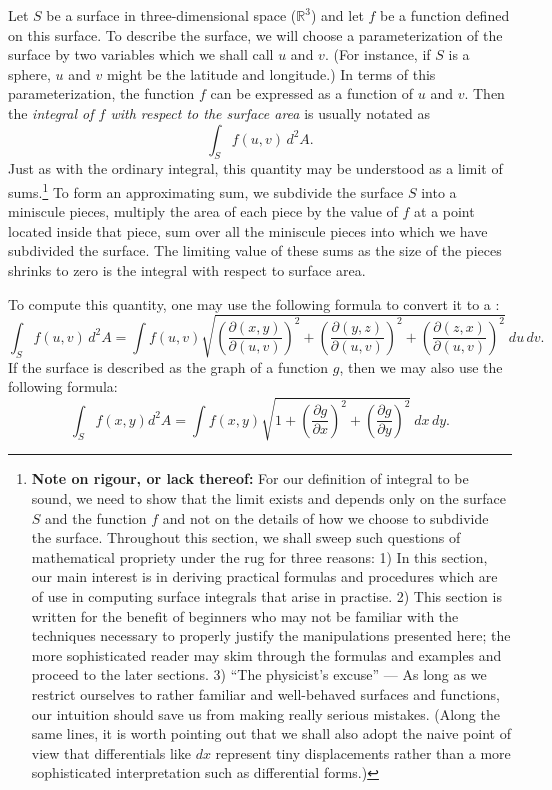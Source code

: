 \documentclass[12pt]{article}
\begin{document}
Let $S$ be a surface in three-dimensional space ($\mathbb{R}^3$) and let $f$ be a function defined on this surface.  To describe the surface, we will choose a parameterization of the surface by two variables which we shall call $u$ and $v$.  (For instance, if $S$ is a sphere, $u$ and $v$ might be the latitude and longitude.)  In terms of this parameterization, the function $f$ can be expressed as a function of $u$ and $v$.  Then the \emph{integral of $f$ with respect to the surface area} is usually notated as
 \[\int_S f(u,v) \, d^2 A.\]
Just as with the ordinary integral, this quantity may be understood as a limit of sums.\footnote{{\bf Note on rigour, or lack thereof:} 
For our definition of integral to be sound, we need to show that the limit exists and depends only on the surface $S$ and the function $f$ and not on the details of how we choose to subdivide the surface.  Throughout this section, we shall sweep such questions of mathematical propriety under the rug for three reasons:  1)  In this section, our main interest is in deriving practical formulas and procedures which are of use in computing surface integrals that arise in practise.  2)  This section is written for the benefit of beginners who may not be familiar with the techniques necessary to properly justify the manipulations presented here; the more sophisticated reader may skim through the formulas and examples and proceed to the later sections.  3) ``The physicist's excuse'' --- As long as we restrict ourselves to rather familiar and well-behaved surfaces and functions, our intuition should save us from making really serious mistakes.  (Along the same lines, it is worth pointing out that we shall also adopt the naive point of view that differentials like $dx$ represent tiny displacements rather than a more sophisticated interpretation such as differential forms.)}  To form an approximating sum, we subdivide the surface $S$ into a miniscule pieces, multiply the area of each piece by the value of $f$ at a point located inside that piece, sum over all the miniscule pieces into which we have subdivided the surface.   The limiting value of these sums as the size of the pieces shrinks to zero is the integral with respect to surface area.

To compute this quantity, one may use the following formula to convert it to a :
 $$\int_S f(u,v) \, d^2 A = \int f(u,v) \sqrt{ \left(  \frac{\partial (x,y)}{\partial (u,v)} \right)^2 +  \left( \frac{\partial (y,z)}{\partial (u,v)} \right)^2 + \left( \frac{\partial (z,x)}{\partial (u,v)} \right)^2 } \> du \, dv.$$
If the surface is described as the graph of a function $g$, then we may also use the following formula:
  $$\int_S f(x,y) d^2 A = \int f(x,y)\sqrt{1 + \left( \frac{\partial g}{\partial x} \right)^2 + \left( \frac{\partial g}{\partial y} \right)^2} \> dx \, dy.$$
\end{document}
